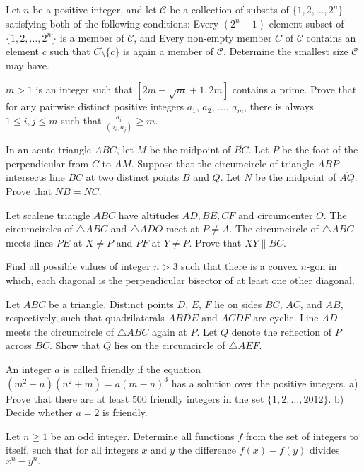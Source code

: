 \documentclass[11pt]{scrartcl}
\begin{document}
\begin{problem}[9130156978935948779]
	Let $n{}$ be a positive integer, and let $\mathcal{C}$ be a collection of subsets of $\{1,2,\ldots,2^n\}$ satisfying both of the following conditions:
Every $(2^n-1)$-element subset of $\{1,2,\ldots,2^n\}$ is a member of $\mathcal{C}$, and
Every non-empty member $C$ of $\mathcal{C}$ contains an element $c$ such that $C\setminus\{c\}$ is again a member of $\mathcal{C}$.
Determine the smallest size $\mathcal{C}$ may have.
\end{problem}
\begin{problem}[9130680105894775026]
$m>1$ is an integer such that $[2m-\sqrt{m}+1, 2m]$ contains a prime. Prove that for any pairwise distinct positive integers $a_1$, $a_2$, $\dots$, $a_m$, there is always $1\leq i,j\leq m$ such that $\frac{a_i}{(a_i, a_j)}\geq m$.
\end{problem}
\begin{problem}[9137209985622350774]
	In an acute triangle $ABC$, let $M$ be the midpoint of $\overline{BC}$. Let $P$ be the foot of the perpendicular from $C$ to $AM$. Suppose that the circumcircle of triangle $ABP$ intersects line $BC$ at two distinct points $B$ and $Q$. Let $N$ be the midpoint of $\overline{AQ}$. Prove that $NB=NC$.
\end{problem}
\begin{problem}[9153191064326230951]
Let scalene triangle $ABC$ have altitudes $AD, BE, CF$ and circumcenter $O$. The circumcircles of $\triangle ABC$ and $\triangle ADO$ meet at $P \ne A$. The circumcircle of $\triangle ABC$ meets lines $PE$ at $X \ne P$ and $PF$ at $Y \ne P$. Prove that $XY \parallel BC$.
\end{problem}
\begin{problem}[9156814072173030162]
Find all possible values of integer $n > 3$ such that there is a convex $n$-gon in which, each diagonal is the perpendicular bisector of at least one other diagonal.
\end{problem}
\begin{problem}[9162230842142232349]
Let $ABC$ be a triangle. Distinct points $D$, $E$, $F$ lie on sides $BC$, $AC$, and $AB$, respectively, such that quadrilaterals $ABDE$ and $ACDF$ are cyclic. Line $AD$ meets the circumcircle of $\triangle ABC$ again at $P$. Let $Q$ denote the reflection of $P$ across $BC$. Show that $Q$ lies on the circumcircle of $\triangle AEF$.
\end{problem}
\begin{problem}[9184583066675086219]
An integer $a$ is called friendly if the equation $(m^2+n)(n^2+m)=a(m-n)^3$ has a solution over the positive integers.
a) Prove that there are at least $500$ friendly integers in the set $\{ 1,2,\ldots ,2012\}$.
b) Decide whether $a=2$ is friendly.
\end{problem}
\begin{problem}[9200700111246490890]
Let $n \geq 1$ be an odd integer. Determine all functions $f$ from the set of integers to itself, such that for all integers $x$ and $y$ the difference $f(x)-f(y)$ divides $x^n-y^n.$
\end{problem}
\end{document}
